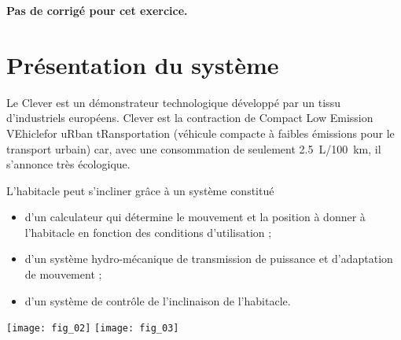 \normaltrue \difficilefalse \tdifficilefalse
\correctionfalse




\setcounter{numques}{0}
\ifcorrection
\else
\textbf{Pas de corrigé pour cet exercice.}
\fi

\ifprof
\else
\section*{Présentation du système}

Le Clever est un démonstrateur technologique développé par un tissu d'industriels européens. Clever est la contraction de Compact Low Emission VEhiclefor uRban tRansportation (véhicule compacte à faibles émissions pour le transport urbain) car, avec une consommation de seulement \SI{2,5}{L}/\SI{100}{km}, il s'annonce très écologique. 

L'habitacle peut s'incliner grâce à un système constitué 
\begin{itemize}
\item d'un calculateur qui détermine le mouvement et la position à donner à l'habitacle en fonction des conditions d'utilisation ;
\item d'un système hydro-mécanique de transmission de puissance et d'adaptation de mouvement ;
\item d'un système de contrôle de l'inclinaison de l'habitacle.
\end{itemize}

\begin{center}
\texttt{[image: fig\_02]}
\texttt{[image: fig\_03]}
\end{center}

